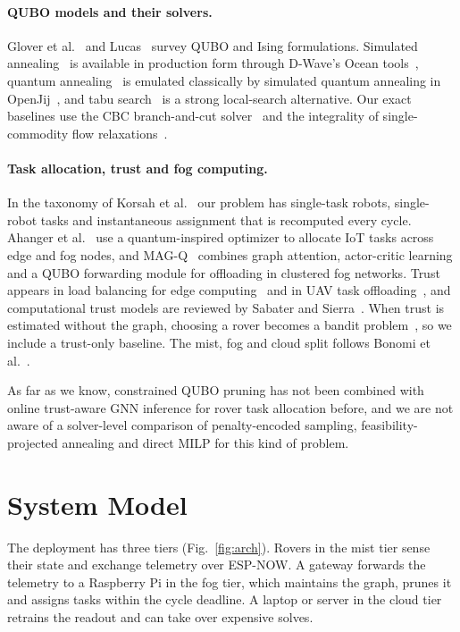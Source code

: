 \documentclass[11pt]{article}
\begin{document}
\paragraph{QUBO models and their solvers.}
Glover et al.~\cite{glover2019} and Lucas~\cite{lucas2014} survey QUBO and
Ising formulations. Simulated annealing~\cite{kirkpatrick1983} is available in
production form through D-Wave's Ocean tools~\cite{ocean}, quantum
annealing~\cite{kadowaki1998} is emulated classically by simulated quantum
annealing in OpenJij~\cite{openjij}, and tabu search~\cite{glover1989} is a
strong local-search alternative. Our exact baselines use the CBC
branch-and-cut solver~\cite{cbc} and the integrality of single-commodity flow
relaxations~\cite{ahuja1993}.

\paragraph{Task allocation, trust and fog computing.}
In the taxonomy of Korsah et al.~\cite{korsah2013} our problem has
single-task robots, single-robot tasks and instantaneous assignment that is
recomputed every cycle. Ahanger et al.~\cite{ahanger2023} use a
quantum-inspired optimizer to allocate IoT tasks across edge and fog nodes,
and MAG-Q~\cite{verma2026} combines graph attention, actor-critic learning and
a QUBO forwarding module for offloading in clustered fog networks. Trust
appears in load balancing for edge computing~\cite{ali2023} and in UAV task
offloading~\cite{guo2021}, and computational trust models are reviewed by
Sabater and Sierra~\cite{sabater2005}. When trust is estimated without the
graph, choosing a rover becomes a bandit problem~\cite{auer2002}, so we
include a trust-only baseline. The mist, fog and cloud split follows Bonomi
et al.~\cite{bonomi2012}.

As far as we know, constrained QUBO pruning has not been combined with
online trust-aware GNN inference for rover task allocation before, and we are
not aware of a solver-level comparison of penalty-encoded sampling,
feasibility-projected annealing and direct MILP for this kind of problem.

\section{System Model}
\label{sec:model}

The deployment has three tiers (Fig.~\ref{fig:arch}). Rovers in the mist tier
sense their state and exchange telemetry over ESP-NOW. A gateway forwards the
telemetry to a Raspberry Pi in the fog tier, which maintains the graph,
prunes it and assigns tasks within the cycle deadline. A laptop or server in
the cloud tier retrains the readout and can take over expensive solves.
\end{document}
